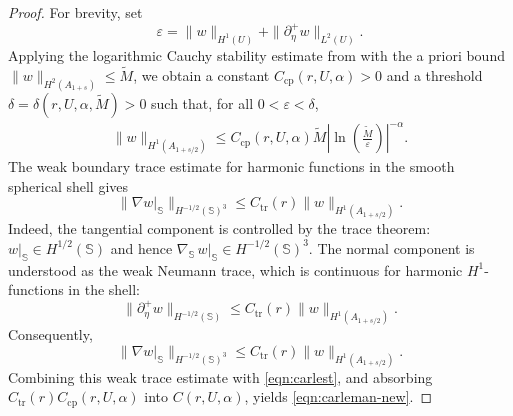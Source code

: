 \documentclass[a4paper, 11pt]{article}
\renewcommand{\SS}{\mathbb{S}}
\begin{document}
\begin{proof}
For brevity, set
	\[
		\varepsilon=\|w\|_{H^1(U)}+\|\partial_\eta^+ w\|_{L^2(U)}.
	\]
	Applying the logarithmic Cauchy stability estimate from \cite[Cor.~2.1]{bou10} with the a priori bound $\|w\|_{H^2(A_{1+s})}\le \tilde{M}$, we obtain a constant $C_{\mathrm{cp}}(r,U,\alpha)>0$ and a threshold $\delta=\delta(r,U,\alpha,\tilde{M})>0$ such that, for all $0<\varepsilon<\delta$,
	\begin{align}
        \|w\|_{H^1(A_{1+s/2})}
		\le
		C_{\mathrm{cp}}(r,U,\alpha)\tilde{M}
		\left|
		\ln\left(
		\frac{\tilde{M}}{\varepsilon}
		\right)
		\right|^{-\alpha}. \label{eqn:carlest}
	\end{align}
	The weak boundary trace estimate for harmonic functions in the smooth spherical shell gives
	\[
		\|\nabla w|_\SS\|_{H^{-1/2}(\SS)^3}
		\le C_{\mathrm{tr}}(r)\|w\|_{H^1(A_{1+s/2})}.
	\]
	Indeed, the tangential component is controlled by the trace theorem:
	$w|_\SS\in H^{1/2}(\SS)$ and hence
	$\nabla_\SS \,w|_\SS\in H^{-1/2}(\SS)^3$. The normal component is understood
	as the weak Neumann trace, which is continuous for harmonic $H^1$-functions
	in the shell:
	\[
		\|\partial_\eta^+ w\|_{H^{-1/2}(\SS)}
		\le C_{\mathrm{tr}}(r)\|w\|_{H^1(A_{1+s/2})}.
	\]
	Consequently,
	\[
		\|\nabla w|_\SS\|_{H^{-1/2}(\SS)^3}
		\le C_{\mathrm{tr}}(r)\|w\|_{H^1(A_{1+s/2})}.
	\]
	Combining this weak trace estimate with \eqref{eqn:carlest}, and absorbing $C_{\mathrm{tr}}(r)C_{\mathrm{cp}}(r,U,\alpha)$ into $C(r,U,\alpha)$, yields \eqref{eqn:carleman-new}.

\end{proof}
\end{document}
